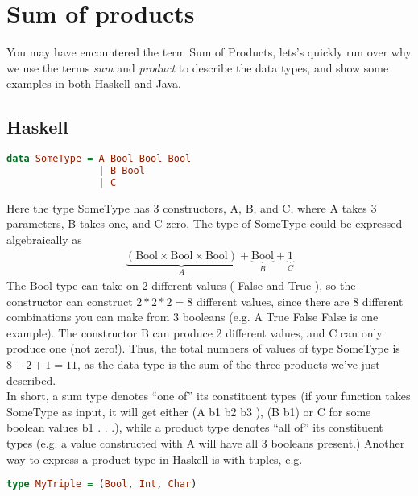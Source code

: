     \section{Sum of products}
        You may have encountered the term \gls{Sum of Products}, lets's quickly run over why we use the terms \textit{sum} and \textit{product} 
        to describe the data types, and show some examples in both Haskell and Java.

        \subsection*{Haskell}
            \begin{lstlisting}[language=Haskell]
data SomeType = A Bool Bool Bool
                | B Bool
                | C
            \end{lstlisting}
            Here the type SomeType has 3 constructors, A, B, and C, where A takes 3 parameters, B takes one, and C zero. 
            The type of SomeType could be expressed algebraically as
            \begin{align*}
                \underbrace{(\text{Bool} \times \text{Bool} \times \text{Bool})}_{A} + \underbrace{\text{Bool}}_{B} + \underbrace{1}_{C}
            \end{align*}
            The Bool type can take on 2 different values
            ( False and True ), so the constructor
            can construct $2 * 2 * 2 = 8$ different values, since there are 8 different combinations you can
            make from 3 booleans (e.g. A True False False is one example). The constructor B can
            produce 2 different values, and C can only produce one (not zero!).
            Thus, the total numbers of values of type SomeType is $8 + 2 + 1 = 11$, as the data type
            is the sum of the three products we've just described.\\
            In short, a sum type denotes “one of” its constituent types (if your function takes SomeType
            as input, it will get either (A b1 b2 b3 ), (B b1) or C for some boolean values b1 . . .), while
            a product type denotes “all of” its constituent types (e.g. a value constructed with A will
            have all 3 booleans present.) Another way to express a product type in Haskell is with tuples,
            e.g.
            \begin{lstlisting}[language=Haskell]
type MyTriple = (Bool, Int, Char)
            \end{lstlisting}

